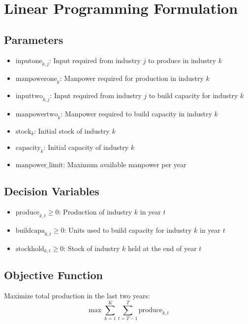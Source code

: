 \documentclass{article}
\begin{document}
\section*{Linear Programming Formulation}

\subsection*{Parameters}
\begin{itemize}
    \item \( \text{inputone}_{k, j} \): Input required from industry \( j \) to produce in industry \( k \)
    \item \( \text{manpowerone}_{k} \): Manpower required for production in industry \( k \)
    \item \( \text{inputtwo}_{k, j} \): Input required from industry \( j \) to build capacity for industry \( k \)
    \item \( \text{manpowertwo}_{k} \): Manpower required to build capacity in industry \( k \)
    \item \( \text{stock}_{k} \): Initial stock of industry \( k \)
    \item \( \text{capacity}_{k} \): Initial capacity of industry \( k \)
    \item \( \text{manpower\_limit} \): Maximum available manpower per year
\end{itemize}

\subsection*{Decision Variables}
\begin{itemize}
    \item \( \text{produce}_{k,t} \geq 0 \): Production of industry \( k \) in year \( t \)
    \item \( \text{buildcapa}_{k,t} \geq 0 \): Units used to build capacity for industry \( k \) in year \( t \)
    \item \( \text{stockhold}_{k,t} \geq 0 \): Stock of industry \( k \) held at the end of year \( t \)
\end{itemize}

\subsection*{Objective Function}
Maximize total production in the last two years:
\[
\max \sum_{k=1}^{K} \sum_{t=T-1}^{T} \text{produce}_{k,t}
\]
\end{document}
